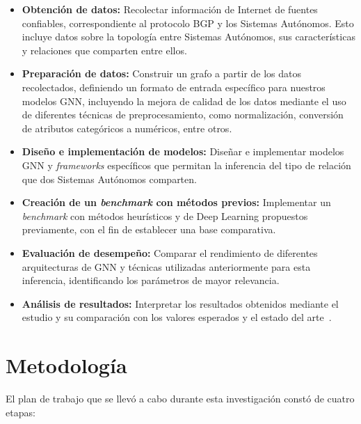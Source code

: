 \begin{itemize}
  \item \textbf{Obtención de datos:} Recolectar información de Internet de fuentes confiables, correspondiente al protocolo BGP y los Sistemas Autónomos. Esto incluye datos sobre la topología entre Sistemas Autónomos, sus características y relaciones que comparten entre ellos.
  
  \item \textbf{Preparación de datos:} Construir un grafo a partir de los datos recolectados, definiendo un formato de entrada específico para nuestros modelos GNN, incluyendo la mejora de calidad de los datos mediante el uso de diferentes técnicas de preprocesamiento, como normalización, conversión de atributos categóricos a numéricos, entre otros.
  
  \item \textbf{Diseño e implementación de modelos:} Diseñar e implementar modelos GNN y \textit{frameworks} específicos que permitan la inferencia del tipo de relación que dos Sistemas Autónomos comparten.
  
  \item \textbf{Creación de un \textit{benchmark} con métodos previos:} Implementar un \textit{benchmark} con métodos heurísticos y de Deep Learning propuestos previamente, con el fin de establecer una base comparativa.

  \item \textbf{Evaluación de desempeño:} Comparar el rendimiento de diferentes arquitecturas de GNN y técnicas utilizadas anteriormente para esta inferencia, identificando los parámetros de mayor relevancia.
  
  \item \textbf{Análisis de resultados:} Interpretar los resultados obtenidos mediante el estudio y su comparación con los valores esperados y el estado del arte~\cite{UnveilingtheTypeRelationshipBetweenAutonomousSystemsUsingDeepLearning}.

\end{itemize}


  
\section{Metodología}

El plan de trabajo que se llevó a cabo durante esta investigación constó de cuatro etapas:


